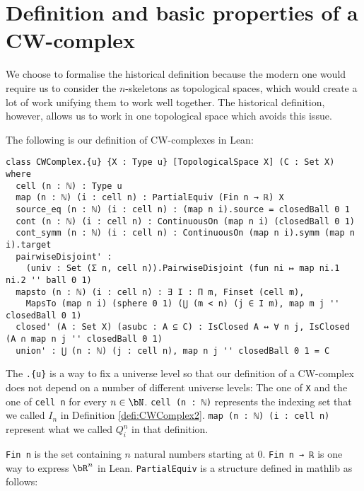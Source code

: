 \section{Definition and basic properties of a CW-complex}

We choose to formalise the historical definition because the modern one would require us to consider the $n$-skeletons as topological spaces, which would create a lot of work unifying them to work well together. 
The historical definition, however, allows us to work in one topological space which avoids this issue.  

The following is our definition of CW-complexes in Lean: 
\href{https://github.com/scholzhannah/CWComplexes/blob/7be4872a05b534011cc969eb5b80a4b7f0bf57e2/CWcomplexes/Definition.lean#L47-L76}{\faExternalLink}

\begin{lstlisting}
class CWComplex.{u} {X : Type u} [TopologicalSpace X] (C : Set X) where
  cell (n : ℕ) : Type u
  map (n : ℕ) (i : cell n) : PartialEquiv (Fin n → ℝ) X
  source_eq (n : ℕ) (i : cell n) : (map n i).source = closedBall 0 1
  cont (n : ℕ) (i : cell n) : ContinuousOn (map n i) (closedBall 0 1)
  cont_symm (n : ℕ) (i : cell n) : ContinuousOn (map n i).symm (map n i).target
  pairwiseDisjoint' :
    (univ : Set (Σ n, cell n)).PairwiseDisjoint (fun ni ↦ map ni.1 ni.2 '' ball 0 1)
  mapsto (n : ℕ) (i : cell n) : ∃ I : Π m, Finset (cell m),
    MapsTo (map n i) (sphere 0 1) (⋃ (m < n) (j ∈ I m), map m j '' closedBall 0 1)
  closed' (A : Set X) (asubc : A ⊆ C) : IsClosed A ↔ ∀ n j, IsClosed (A ∩ map n j '' closedBall 0 1)
  union' : ⋃ (n : ℕ) (j : cell n), map n j '' closedBall 0 1 = C
\end{lstlisting}

The \lstinline|.{u}| is a way to fix a universe level so that our definition of a CW-complex does not depend on a number of different universe levels: The one of \lstinline{X} and the one of \lstinline{cell n} for every $n \in \bN$.
\lstinline{cell (n : ℕ)} represents the indexing set that we called $I_n$ in Definition \ref{defi:CWComplex2}. \lstinline{map (n : ℕ) (i : cell n)} represent what we called $Q_i^n$ in that definition.

\lstinline{Fin n}
\href{https://github.com/leanprover/lean4/blob/0edf1bac392f7e2fe0266b28b51c498306363a84/src/Init/Prelude.lean#L1826-L1838}{\faExternalLink} 
is the set containing $n$ natural numbers starting at 0.
\lstinline{Fin n → ℝ} is one way to express $\bR^n$ in Lean.
\lstinline{PartialEquiv} is a structure defined in mathlib as follows: 
\href{https://github.com/leanprover-community/mathlib4/blob/ed125a4216d18273cb1b96d4c846d32b85d74faf/Mathlib/Logic/Equiv/PartialEquiv.lean#L113-L134}{\faExternalLink}

